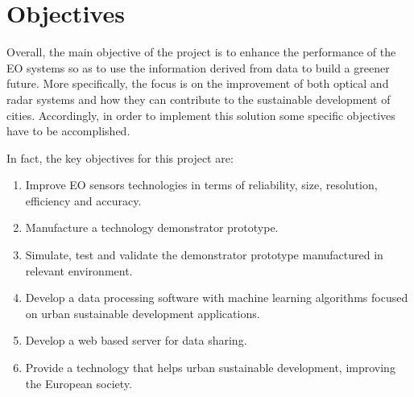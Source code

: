 \section{Objectives}

Overall, the main objective of the project is to enhance the performance of the EO systems so as to use the information derived from data to build a greener future. More specifically, the focus is on the improvement of both optical and radar systems and how they can contribute to the sustainable development of cities. Accordingly, in order to implement this solution some specific objectives have to be accomplished.

In fact, the key objectives for this project are:

\begin{enumerate}

	\item Improve EO sensors technologies in terms of reliability, size, resolution, efficiency and accuracy.

	\item Manufacture a technology demonstrator prototype.

	\item Simulate, test and validate the demonstrator prototype manufactured in relevant environment.

	\item Develop a data processing software with machine learning algorithms focused on urban sustainable development applications. 

	\item Develop a web based server for data sharing. 

	\item Provide a technology that helps urban sustainable development, improving the European society.
 
\end{enumerate}